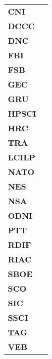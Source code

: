 \begin{tabu} to \textwidth {XX[3]}

    \textbf{CNI} &  \\

    \textbf{DCCC} &  \\

    \textbf{DNC} &  \\

    \textbf{FBI} &  \\

    \textbf{FSB} &  \\

    \textbf{GEC} &  \\

    \textbf{GRU} &  \\

    \textbf{HPSCI} &  \\

    \textbf{HRC} &  \\

    \textbf{TRA} &  \\

    \textbf{LCILP} &  \\

    \textbf{NATO} &  \\

    \textbf{NES} &  \\

    \textbf{NSA} &  \\

    \textbf{ODNI} &  \\

    \textbf{PTT} &  \\

    \textbf{RDIF} &  \\

    \textbf{RIAC} &  \\

    \textbf{SBOE} &  \\

    \textbf{SCO} &  \\

    \textbf{SIC} &  \\

    \textbf{SSCI} &  \\

    \textbf{TAG} &  \\

    \textbf{VEB} &  \\

\end{tabu}
